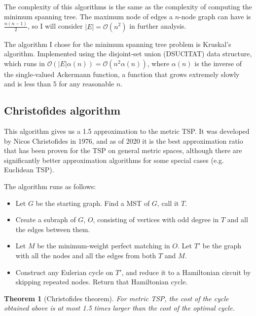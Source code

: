 \documentclass[12pt,twoside,notitlepage]{report}
\newtheorem{theorem}{Theorem}
\begin{document}
The complexity of this algorithms is the same as the complexity of computing the minimum spanning tree. The maximum node of edges a $n$-node graph can have is $\frac{n(n - 1)}{2}$, so I will consider $|E| = \mathcal{O}(n^2)$ in further analysis.

The algorithm I chose for the minimum spanning tree problem is Kruskal's algorithm. Implemented using the disjoint-set union (DSUCITAT) data structure, which runs in $ \mathcal{O}(|E|\alpha(n)) = \mathcal{O}(n^2\alpha(n)) $, where $\alpha(n)$ is the inverse of the single-valued Ackermann function, a function that grows extremely slowly and is less than 5 for any reasonable $n$.

\subsection{Christofides algorithm}

This algorithm gives us a 1.5 approximation to the metric TSP. It was developed by Nicos Christofides in 1976\cite{christofides1976worst}, and as of 2020 it is the best approximation ratio that has been proven for the TSP on general metric spaces, although there are significantly better approximation algorithms for some special cases (e.g. Euclidean TSP).

The algorithm runs as follows:

\begin{itemize}

\item Let $G$ be the starting graph. Find a MST of $G$, call it $T$.
\item Create a subraph of $G$, $O$, consisting of vertices with odd degree in $T$ and all the edges between them.
\item Let $M$ be the minimum-weight perfect matching in $O$. Let $T'$ be the graph with all the nodes and all the edges from both $T$ and $M$.
\item Construct any Eulerian cycle on $T'$, and reduce it to a Hamiltonian circuit by skipping repeated nodes. Return that Hamiltonian cycle.

\end{itemize}

\begin{theorem}[Christofides theorem]

For metric TSP, the cost of the cycle obtained above is at most 1.5 times larger than the cost of the optimal cycle.

\end{theorem}
\end{document}
